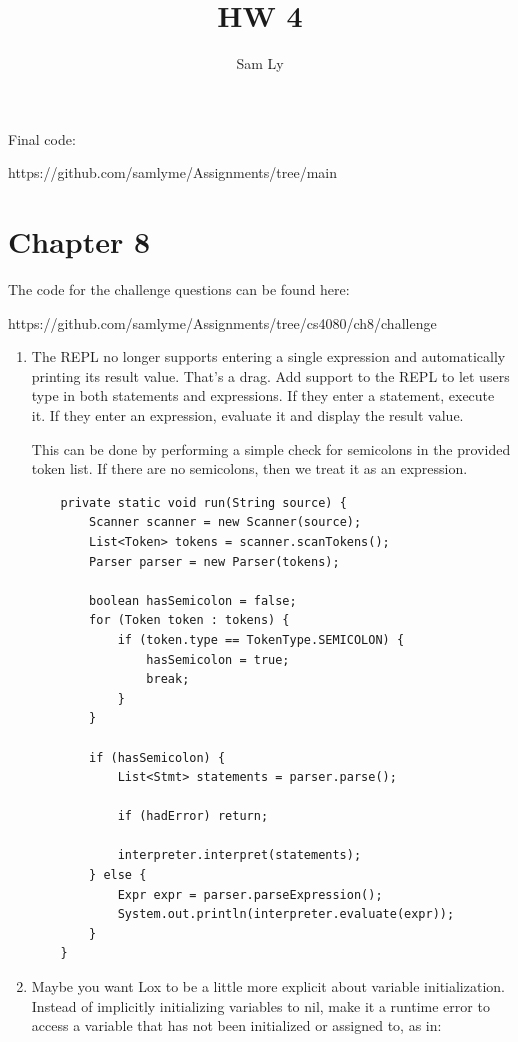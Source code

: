 \documentclass{article}
\title{HW 4}
\author{Sam Ly}
\begin{document}
\maketitle

Final code:

https://github.com/samlyme/Assignments/tree/main

\section*{Chapter 8}

The code for the challenge questions can be found here: 

https://github.com/samlyme/Assignments/tree/cs4080/ch8/challenge

\begin{enumerate}
    \item {
        The REPL no longer supports entering a single expression and automatically printing its result value. That’s a drag. Add support to the REPL to let users type in both statements and expressions. If they enter a statement, execute it. If they enter an expression, evaluate it and display the result value.

        This can be done by performing a simple check for semicolons in the provided 
        token list. If there are no semicolons, then we treat it as an expression.

        \begin{lstlisting}
    private static void run(String source) {
        Scanner scanner = new Scanner(source);
        List<Token> tokens = scanner.scanTokens();
        Parser parser = new Parser(tokens);

        boolean hasSemicolon = false;
        for (Token token : tokens) {
            if (token.type == TokenType.SEMICOLON) {
                hasSemicolon = true;
                break;
            }
        }

        if (hasSemicolon) {
            List<Stmt> statements = parser.parse();

            if (hadError) return;

            interpreter.interpret(statements);
        } else {
            Expr expr = parser.parseExpression();
            System.out.println(interpreter.evaluate(expr));
        }
    }
        \end{lstlisting}
    }

    \item {
        Maybe you want Lox to be a little more explicit about variable initialization. Instead of implicitly initializing variables to nil, make it a runtime error to access a variable that has not been initialized or assigned to, as in:

}
\end{enumerate}
\end{document}
